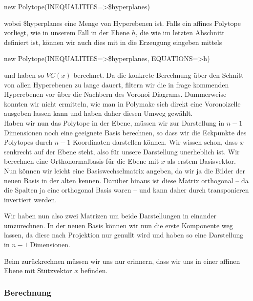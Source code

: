          \begin{code}
            new Polytope(INEQUALITIES=>\$hyperplanes)
         \end{code}

         wobei \$hyperplanes eine Menge von Hyperebenen ist. Falls ein affines Polytope vorliegt, wie in unserem Fall in der Ebene $h$, die wie im letzten Abschnitt
         definiert ist, können wir auch dies mit in die Erzeugung eingeben mittels

         \begin{code}
            new Polytope(INEQUALITIES=>\$hyperplanes, EQUATIONS=>{h})
         \end{code}

         und haben so $VC(x)$ berechnet. Da die konkrete Berechnung über den Schnitt von allen Hyperebenen zu lange dauert, filtern wir die in frage kommenden Hyperebenen vor
         über die Nachbern des Voronoi Diagrams. Dummerweise konnten wir nicht ermitteln, wie man in Polymake sich direkt eine Voronoizelle ausgeben lassen kann und
         haben daher diesen Umweg gewählt.\\

         Haben wir nun das Polytope in der Ebene, müssen wir zur Darstellung in $n-1$ Dimensionen noch eine geeignete Basis berechnen, so dass wir
         die Eckpunkte des Polytopes durch $n-1$ Koordinaten darstellen können. Wir wissen schon, dass $x$ senkrecht auf der Ebene steht, also für unsere Darstellung 
         unerheblich ist. Wir berechnen eine Orthonormalbasis für die Ebene mit $x$ als erstem Basisvektor. Nun können wir leicht eine Basiswechselmatrix angeben,
         da wir ja die Bilder der neuen Basis in der alten kennen. Darüber hinaus ist diese Matrix orthogonal -- da die Spalten ja eine orthogonal Basis waren -- und
         kann daher durch transponieren invertiert werden.

         Wir haben nun also zwei Matrizen um beide Darstellungen in einander umzurechnen. In der neuen Basis können wir nun die erste Komponente weg lassen,
         da diese nach Projektion nur genullt wird und haben so eine Darstellung in $n-1$ Dimensionen.

         Beim zurückrechnen müssen wir uns nur erinnern, dass wir uns in einer affinen Ebene mit Stützvektor $x$ befinden.

        \subsubsection*{Berechnung}

